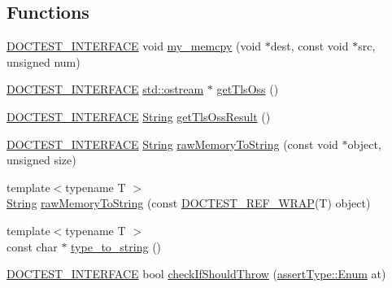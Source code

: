 \subsection*{Functions}
\begin{DoxyCompactItemize}
\item 
\mbox{\hyperlink{doctest_8h_a9c16ffc635ec47f07797d21ede26b1a5}{D\+O\+C\+T\+E\+S\+T\+\_\+\+I\+N\+T\+E\+R\+F\+A\+CE}} void \mbox{\hyperlink{namespacedoctest_1_1detail_a4027cb5407ce2ff132645e89bba97010}{my\+\_\+memcpy}} (void $\ast$dest, const void $\ast$src, unsigned num)
\item 
\mbox{\hyperlink{doctest_8h_a9c16ffc635ec47f07797d21ede26b1a5}{D\+O\+C\+T\+E\+S\+T\+\_\+\+I\+N\+T\+E\+R\+F\+A\+CE}} \mbox{\hyperlink{doctest_8h_a116af65cb5e924b33ad9d9ecd7a783f3}{std\+::ostream}} $\ast$ \mbox{\hyperlink{namespacedoctest_1_1detail_a52299f4a981a01a3d3fe6e8d7518823d}{get\+Tls\+Oss}} ()
\item 
\mbox{\hyperlink{doctest_8h_a9c16ffc635ec47f07797d21ede26b1a5}{D\+O\+C\+T\+E\+S\+T\+\_\+\+I\+N\+T\+E\+R\+F\+A\+CE}} \mbox{\hyperlink{classdoctest_1_1_string}{String}} \mbox{\hyperlink{namespacedoctest_1_1detail_a7b0b3df5fe79d7ffa8fa138201476df1}{get\+Tls\+Oss\+Result}} ()
\item 
\mbox{\hyperlink{doctest_8h_a9c16ffc635ec47f07797d21ede26b1a5}{D\+O\+C\+T\+E\+S\+T\+\_\+\+I\+N\+T\+E\+R\+F\+A\+CE}} \mbox{\hyperlink{classdoctest_1_1_string}{String}} \mbox{\hyperlink{namespacedoctest_1_1detail_adb894f73b88fb3b39d6c48d80451f5ff}{raw\+Memory\+To\+String}} (const void $\ast$object, unsigned size)
\item 
{\footnotesize template$<$typename T $>$ }\\\mbox{\hyperlink{classdoctest_1_1_string}{String}} \mbox{\hyperlink{namespacedoctest_1_1detail_a28da75fd01ab3d943436aa69876b7151}{raw\+Memory\+To\+String}} (const \mbox{\hyperlink{doctest_8h_af2901cafb023c57fb672ccb1bf14f2eb}{D\+O\+C\+T\+E\+S\+T\+\_\+\+R\+E\+F\+\_\+\+W\+R\+AP}}(T) object)
\item 
{\footnotesize template$<$typename T $>$ }\\const char $\ast$ \mbox{\hyperlink{namespacedoctest_1_1detail_a8ad4f98867561d1ca7865874a2f82d7e}{type\+\_\+to\+\_\+string}} ()
\item 
\mbox{\hyperlink{doctest_8h_a9c16ffc635ec47f07797d21ede26b1a5}{D\+O\+C\+T\+E\+S\+T\+\_\+\+I\+N\+T\+E\+R\+F\+A\+CE}} bool \mbox{\hyperlink{namespacedoctest_1_1detail_acec9ff072dd86af95225a8beb9c57298}{check\+If\+Should\+Throw}} (\mbox{\hyperlink{namespacedoctest_1_1assert_type_ae1bb5bed722f34f1c38b83cb19d326d3}{assert\+Type\+::\+Enum}} at)

\end{DoxyCompactItemize}
